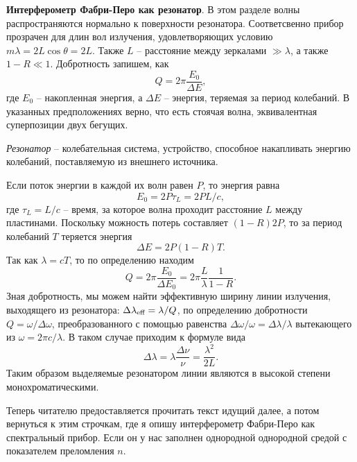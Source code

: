\textbf{Интерферометр Фабри-Перо как резонатор}.
В этом разделе волны распространяются нормально к поверхности резонатора. Соответсвенно прибор прозрачен для длин вол излучения, удовлетворяющих условию $m \lambda = 2 L \cos \theta = 2 L$. Также $L$ -- расстояние между зеркалами $\gg \lambda$, а также $1-R \ll 1$. Добротность запишем, как
\begin{equation*}
    Q = 2 \pi \frac{E_0}{\Delta E}, 
\end{equation*}
где $E_0$ -- накопленная энергия, а $\Delta E$ -- энергия, теряемая за период колебаний. 
В указанных предположениях верно, что есть стоячая волна, эквивалентная суперпозиции двух бегущих. 



\begin{to_def}
    \textit{Резонатор} -- колебательная система, устройство, способное накапливать энергию колебаний, поставляемую из внешнего источника. 
\end{to_def}


Если поток энергии в каждой их волн равен $P$, то энергия равна 
\begin{equation*}
    E_0 = 2 P \tau_L = 2 P L/c,
\end{equation*}
где $\tau_L = L/c$ -- время, за которое волна проходит расстояние $L$ между пластинами. Поскольку можность потерь составляет $(1-R) 2 P$, то за период колебаний $T$ теряется энергия 
\begin{equation*}
    \Delta E = 2 P (1-R) T.
\end{equation*}
Так как $\lambda = c T$, то по определению находим
\begin{equation*}
    Q = 2 \pi \frac{E_0}{\Delta E_0} = 2 \pi \frac{L}{\lambda} \frac{1}{1-R}.
\end{equation*}
Зная добротность, мы можем найти эффективную ширину линии излучения, выходящего из резонатора:
$\Delta \lambda_{\textnormal{eff}} = \lambda/Q$, по определению добротности $Q = \omega / \Delta \omega$, преобразованного с помощью равенства $\Delta \omega/\omega = \Delta \lambda/\lambda$ вытекающего из $\omega = 2 \pi c / \lambda$. В таком случае приходим к формуле вида
\begin{equation*}
    \Delta \lambda = \lambda \frac{\Delta \nu}{\nu} = \frac{\lambda^2}{2L}.
\end{equation*}
Таким образом выделяемые резонатором линии являются в высокой степени монохроматическими. 

Теперь читателю предоставляется прочитать текст идущий далее, а потом вернуться к этим строчкам, где я опишу интерферометр Фабри-Перо как спектральный прибор.
Если он у нас заполнен однородной однородной средой с показателем преломления $n$. 

